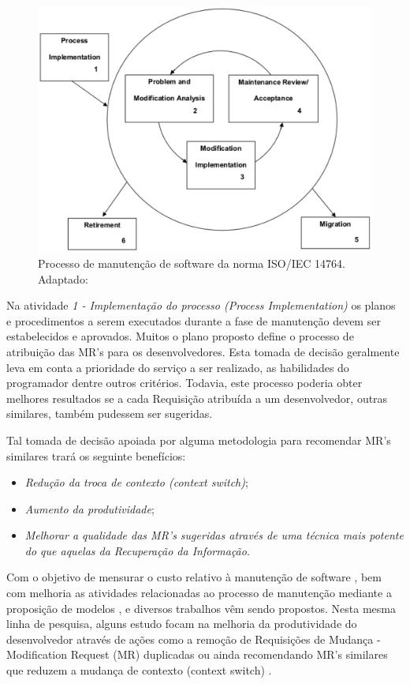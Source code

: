\documentclass[msc,proposal,hidelot,hideabstract]{ppgccufmg} %
\begin{document}
\begin{figure}[hbtp]
\centering
\includegraphics[width=.75\textwidth]{../img/maintence_process.eps}
\caption{Processo de manutenção de software da norma ISO/IEC 14764. Adaptado: \cite{1703974}}
\label{fig:maintence-process}
\end{figure}

Na atividade \textit{1 - Implementação do processo (Process
Implementation)} os planos e procedimentos a serem executados
durante a fase de manutenção devem ser estabelecidos e aprovados. Muitos o
plano proposto define o processo de atribuição das MR's para os
desenvolvedores. Esta tomada de decisão geralmente leva em conta a prioridade
do serviço a ser realizado, as habilidades do programador dentre outros
critérios. Todavia, este processo poderia obter melhores resultados se a cada
Requisição atribuída a um desenvolvedor, outras similares, também pudessem ser
sugeridas.


Tal tomada de decisão apoiada por alguma metodologia para recomendar MR's
similares trará os seguinte benefícios:

\begin{itemize}
\item \textit{Redução da troca de contexto (context switch)};
\item \textit{Aumento da produtividade};
\item \textit{Melhorar a qualidade das MR's sugeridas através de uma técnica mais
  potente do que aquelas da Recuperação da Informação}.
\end{itemize}

Com o objetivo de mensurar o custo relativo à manutenção de software
\cite{benaroch2013primary,5873461,ren2011research}, bem com melhoria as
atividades relacionadas ao processo de manutenção  mediante a proposição
de modelos \cite{April200973}, \cite{930170} e \cite{5741246} diversos
trabalhos vêm sendo propostos. Nesta mesma linha de pesquisa, alguns estudo
focam na melhoria da produtividade do desenvolvedor através de ações como a remoção de Requisições de Mudança -
Modification Request (MR) duplicadas
\cite{Alipour:2013:CAT:2487085.2487123,6671283,09639314} ou ainda recomendando
MR's similares que reduzem a mudança de contexto (context switch) \cite{5741246,101186}.
\end{document}
